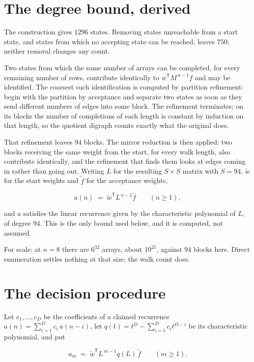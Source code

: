 \documentclass[11pt]{article}
\theoremstyle{definition}
\begin{document}
\section{The degree bound, derived}

The construction gives $1296$ states. Removing states unreachable from a start state, and states from which no accepting state can be reached, leaves $750$; neither removal changes any count.

Two states from which the same number of arrays can be completed, for every remaining number of rows, contribute identically to $w^{\mathsf T}M^{\,n-1}f$ and may be identified. The coarsest such identification is computed by partition refinement: begin with the partition by acceptance and separate two states as soon as they send different numbers of edges into some block. The refinement terminates; on its blocks the number of completions of each length is constant by induction on that length, so the quotient digraph counts exactly what the original does.

That refinement leaves $94$ blocks. The mirror reduction is then applied: two blocks receiving the same weight from the start, for every walk length, also contribute identically, and the refinement that finds them looks at edges coming in rather than going out. Writing $L$ for the resulting $S \times S$ matrix with $S = 94$, $\tilde w$ for the start weights and $\tilde f$ for the acceptance weights,

\[a(n) \;=\; \tilde w^{\mathsf T} L^{\,n-1} \tilde f \qquad (n \ge 1),\]

and $a$ satisfies the linear recurrence given by the characteristic polynomial of $L$, of degree $94$. This is the only bound used below, and it is computed, not assumed.

For scale: at $n = 8$ there are $6^{32}$ arrays, about $10^{25}$, against $94$ blocks here. Direct enumeration settles nothing at that size; the walk count does.

\section{The decision procedure}

Let $c_1,\dots,c_D$ be the coefficients of a claimed recurrence $a(n) = \sum_{i=1}^{D} c_i\,a(n-i)$, let $q(t) = t^{D} - \sum_{i=1}^{D} c_i t^{D-i}$ be its characteristic polynomial, and put

\[u_m \;=\; \tilde w^{\mathsf T} L^{\,m-1} q(L)\,\tilde f \qquad (m \ge 1).\]
\end{document}
